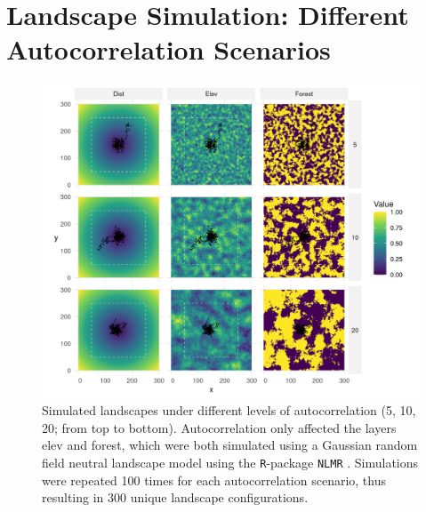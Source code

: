 \documentclass[abstract=on,10pt,a4paper,bibliography=totocnumbered]{article}
\begin{document}
\section{Landscape Simulation: Different Autocorrelation Scenarios}
\begin{figure}[!ht]
  \begin{center}
  \includegraphics[width = \textwidth]{99_CovariatesAppendix.png}
  \caption{Simulated landscapes under different levels of autocorrelation (5,
  10, 20; from top to bottom). Autocorrelation only affected the layers
  \textsf{elev} and \textsf{forest}, which were both simulated using a Gaussian
  random field neutral landscape model \citep{Schlather.2015} using the
  \texttt{R}-package \texttt{NLMR} \citep{Sciaini.2018}. Simulations were
  repeated 100 times for each autocorrelation scenario, thus resulting in 300
  unique landscape configurations.}
  \label{Covariates}
  \end{center}
\end{figure}

\newpage
\end{document}
